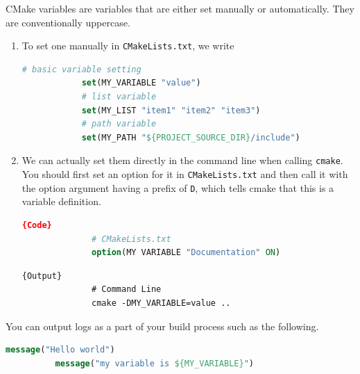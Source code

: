 \documentclass{article}
\newcounter{definition}[section]
\begin{document}
      \begin{definition}
        \label{def:cmake-options-and-variables}
        CMake variables are variables that are either set manually or automatically. They are conventionally uppercase. 
        \begin{enumerate}
          \item To set one manually in \texttt{CMakeLists.txt}, we write 
          \begin{lstlisting}[language=CMake]
            # basic variable setting 
            set(MY_VARIABLE "value") 
            # list variable 
            set(MY_LIST "item1" "item2" "item3") 
            # path variable 
            set(MY_PATH "${PROJECT_SOURCE_DIR}/include")
          \end{lstlisting}

          \item We can actually set them directly in the command line when calling \texttt{cmake}. You should first set an option for it in \texttt{CMakeLists.txt} and then call it with the option argument having a prefix of \texttt{D}, which tells cmake that this is a variable definition. 
            
          \noindent\begin{minipage}{.47\textwidth}
            \begin{lstlisting}[language=CMake]{Code}
              # CMakeLists.txt
              option(MY VARIABLE "Documentation" ON)
            \end{lstlisting}
            \end{minipage}
            \hfill
            \begin{minipage}{.46\textwidth}
            \begin{lstlisting}[]{Output}
              # Command Line 
              cmake -DMY_VARIABLE=value ..
            \end{lstlisting}
          \end{minipage}

        \end{enumerate}
      \end{definition} 

      \begin{definition}[Message]
        \label{def:message}
        You can output logs as a part of your build process such as the following. 
        \begin{lstlisting}[language=CMake]
          message("Hello world") 
          message("my variable is ${MY_VARIABLE}")
        \end{lstlisting}
      \end{definition}
\end{document}

